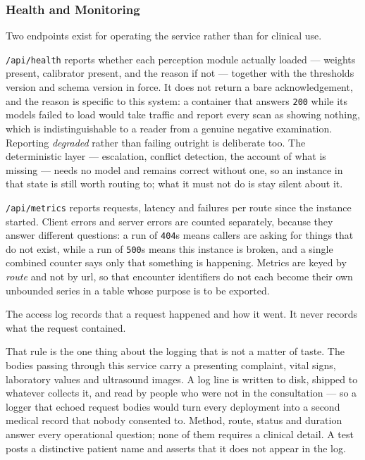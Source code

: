\subsubsection{Health and Monitoring}

Two endpoints exist for operating the service rather than for clinical use.

\texttt{/api/health} reports whether each perception module actually loaded --- weights present,
calibrator present, and the reason if not --- together with the thresholds version and schema
version in force. It does not return a bare acknowledgement, and the reason is specific to this
system: a container that answers \texttt{200} while its models failed to load would take
traffic and report every scan as showing nothing, which is indistinguishable to a reader from a
genuine negative examination. Reporting \emph{degraded} rather than failing outright is
deliberate too. The deterministic layer --- escalation, conflict detection, the account of what
is missing --- needs no model and remains correct without one, so an instance in that state is
still worth routing to; what it must not do is stay silent about it.

\texttt{/api/metrics} reports requests, latency and failures per route since the instance
started. Client errors and server errors are counted separately, because they answer different
questions: a run of \texttt{404}s means callers are asking for things that do not exist, while
a run of \texttt{500}s means this instance is broken, and a single combined counter says only
that something is happening. Metrics are keyed by \emph{route} and not by \gls{url}, so that
encounter identifiers do not each become their own unbounded series in a table whose purpose is
to be exported.

\begin{keystatement}
The access log records that a request happened and how it went. It never records what the
request contained.
\end{keystatement}

That rule is the one thing about the logging that is not a matter of taste. The bodies passing
through this service carry a presenting complaint, vital signs, laboratory values and
ultrasound images. A log line is written to disk, shipped to whatever collects it, and read by
people who were not in the consultation --- so a logger that echoed request bodies would turn
every deployment into a second medical record that nobody consented to. Method, route, status
and duration answer every operational question; none of them requires a clinical detail. A test
posts a distinctive patient name and asserts that it does not appear in the log.

